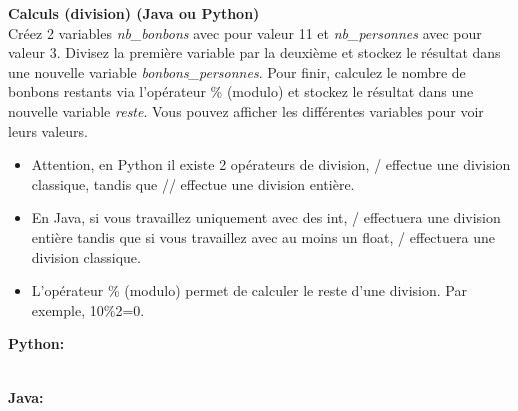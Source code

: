  \begin{Exercice}[10 minutes] \textbf{Calculs (division) (Java ou Python)}\\
     Créez 2 variables \textit{nb\_bonbons} avec pour valeur 11 et \textit{nb\_personnes} avec pour valeur 3. Divisez la première variable par la deuxième et stockez le résultat dans une nouvelle variable \textit{bonbons\_personnes}. Pour finir, calculez le nombre de bonbons restants via l'opérateur \% (modulo) et stockez le résultat dans une nouvelle variable \textit{reste}. Vous pouvez afficher les différentes variables pour voir leurs valeurs. \\
     
      \begin{conseil}
         \begin{itemize}
            \item Attention, en Python il existe 2 opérateurs de division, / effectue une division classique, tandis que // effectue une division entière.
            \item En Java, si vous travaillez uniquement avec des int, / effectuera une division entière tandis que si vous travaillez avec au moins un float, / effectuera une division classique.
            \item L'opérateur \% (modulo) permet de calculer le reste d'une division. Par exemple, 10\%2=0.
         \end{itemize}
      \end{conseil}
      \begin{solution}
      
      \textbf{Python:}
      
      
      
      \textbf{\\Java:}
      
             
      \end{solution}   
  \end{Exercice}
  
